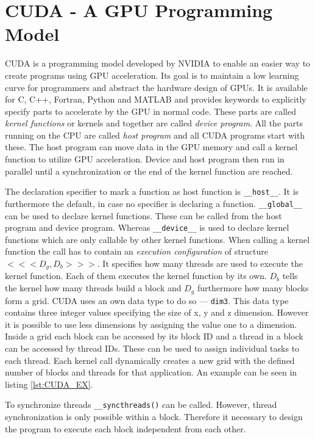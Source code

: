 \documentclass[a4paper,12pt]{llncs}
\numberwithin{equation}{section}
\begin{document}
\section{CUDA - A GPU Programming Model}
\label{sec:CUDA}
  CUDA is a programming model developed by NVIDIA to enable an easier way to create programs using GPU acceleration.
  Its goal is to maintain a low learning curve for programmers and abstract the hardware design of GPUs.
  It is available for C, C++, Fortran, Python and MATLAB and provides keywords to explicitly specify parts to accelerate by the GPU in normal code.
  These parts are called \textit{kernel functions} or kernels and together are called \textit{device program}.
  All the parts running on the CPU are called \textit{host program} and all CUDA programs start with these.
  The host program can move data in the GPU memory and call a kernel function to utilize GPU acceleration.
  Device and host program then run in parallel until a synchronization or the end of the kernel function are reached.~\cite{NVIDIA.2019}~\cite{Rauber.2012}~\cite{Huang.2008}

  The declaration specifier to mark a function as host function is \texttt{\_\_host\_\_}.
  It is furthermore the default, in case no specifier is declaring a function.
  \texttt{\_\_global\_\_} can be used to declare kernel functions.
  These can be called from the host program and device program.
  Whereas \texttt{\_\_device\_\_} is used to declare kernel functions which are only callable by other kernel functions.
  When calling a kernel function the call has to contain an \textit{execution configuration} of structure \(<<<D_{g}, D_{b}>>>\).
  It specifies how many threads are used to execute the kernel function.
  Each of them executes the kernel function by its own.
  \(D_b\) tells the kernel how many threads build a block and \(D_g\) furthermore how many blocks form a grid.
  CUDA uses an own data type to do so --- \texttt{dim3}.
  This data type contains three integer values specifying the size of x, y and z dimension.
  However it is possible to use less dimensions by assigning the value one to a dimension.
  Inside a grid each block can be accessed by its block ID and a thread in a block can be accessed by thread IDs.
  These can be used to assign individual tasks to each thread.
  Each kernel call dynamically creates a new grid with the defined number of blocks and threads for that application.
  An example can be seen in listing \ref{lst:CUDA_EX}.%

  To synchronize threads \texttt{\_\_syncthreads()} can be called.
  However, thread synchronization is only possible within a block.
  Therefore it necessary to design the program to execute each block independent from each other.%
\end{document}
